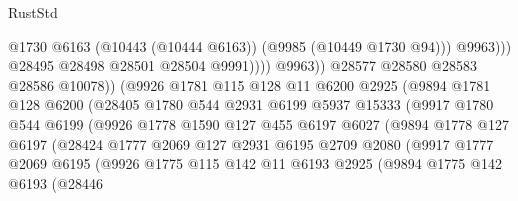 \begin{lexlean}{RustStd}
\begin{coremodule}
                                          @1730
                                          @6163
                                          (@10443 (@10444 @6163))
                                          (@9985 (@10449 @1730 @94)))
                                        @9963)))
                                  @28495
                                  @28498
                                  @28501
                                  @28504
                                  @9991))))
                          @9963))
                      @28577
                      @28580
                      @28583
                      @28586
                      @10078))
                  (@9926
                    @1781
                    @115
                    @128
                    @11
                    @6200
                    @2925
                    (@9894
                      @1781
                      @128
                      @6200
                      (@28405
                        @1780
                        @544
                        @2931
                        @6199
                        @5937
                        @15333
                        (@9917
                          @1780
                          @544
                          @6199
                          (@9926
                            @1778
                            @1590
                            @127
                            @455
                            @6197
                            @6027
                            (@9894
                              @1778
                              @127
                              @6197
                              (@28424
                                @1777
                                @2069
                                @127
                                @2931
                                @6195
                                @2709
                                @2080
                                (@9917
                                  @1777
                                  @2069
                                  @6195
                                  (@9926
                                    @1775
                                    @115
                                    @142
                                    @11
                                    @6193
                                    @2925
                                    (@9894
                                      @1775
                                      @142
                                      @6193
                                      (@28446

\end{coremodule}
\end{lexlean}

